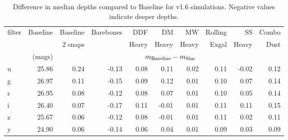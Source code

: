 \begin{table}
\begin{tabular}{lrrrrrrrrr}
\toprule
filter &  Baseline &  Baseline &  Barebones &  DDF  &  DM  &  MW  &  Rolling  &  SS  &  Combo  \\
 & & 2 snaps & & Heavy & Heavy & Heavy & Exgal & Heavy & Dust \\
 & (mags) &  \multicolumn{8}{c}{$m_{\rm{Baseline}} - m_{\rm{Sim}}$} \\ 
\hline
     u &     25.86 &              0.24 &      -0.13 &       0.08 &      0.11 &      0.02 &           0.11 &     -0.02 &        0.12 \\
     g &     26.97 &              0.11 &      -0.15 &       0.09 &      0.12 &      0.01 &           0.10 &      0.07 &        0.14 \\
     r &     26.95 &              0.08 &      -0.12 &       0.08 &      0.07 &      0.01 &           0.10 &      0.05 &        0.14 \\
     i &     26.40 &              0.07 &      -0.17 &       0.11 &     -0.01 &      0.01 &           0.11 &      0.11 &        0.15 \\
     z &     25.67 &              0.06 &      -0.12 &       0.08 &     -0.01 &      0.01 &           0.11 &      0.02 &        0.11 \\
     y &     24.90 &              0.06 &      -0.14 &       0.06 &      0.04 &      0.01 &           0.09 &      0.03 &        0.09 \\
\end{tabular}
\caption{Difference in median depths compared to Baseline for v1.6 simulations. Negative values indicate deeper depths.}\label{table:depths}
\end{table}

